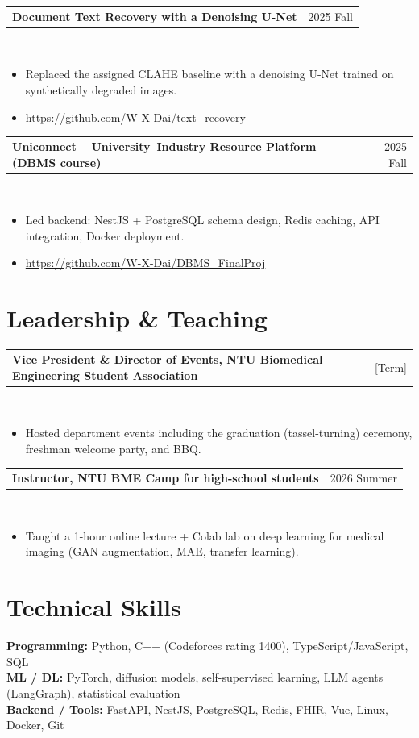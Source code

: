 \documentclass[10pt]{article}
\makeatletter
\newcommand{\entry}[2]{\par\vspace{3pt}\begin{tabularx}{\textwidth}{@{}>{\raggedright\arraybackslash}X r@{}}\textbf{#1} & #2\end{tabularx}\\[-9pt]}
\makeatother
\begin{document}
\entry{Document Text Recovery with a Denoising U-Net}{2025 Fall}
\begin{itemize}
  \item Replaced the assigned CLAHE baseline with a denoising U-Net trained on synthetically degraded images.
        
  \item \href{https://github.com/W-X-Dai/text_recovery}{https://github.com/W-X-Dai/text\_recovery}
\end{itemize}

\entry{Uniconnect -- University--Industry Resource Platform (DBMS course)}{2025 Fall}
\begin{itemize}
  \item Led backend: NestJS + PostgreSQL schema design, Redis caching, API integration, Docker deployment.
  \item \href{https://github.com/W-X-Dai/DBMS_FinalProj}{https://github.com/W-X-Dai/DBMS\_FinalProj}
\end{itemize}

\section*{Leadership \& Teaching}
\entry{Vice President \& Director of Events, NTU Biomedical Engineering Student Association}{[Term]}
\begin{itemize}
  \item Hosted department events including the graduation (tassel-turning) ceremony, freshman welcome party, and BBQ.
\end{itemize}
\entry{Instructor, NTU BME Camp for high-school students}{2026 Summer}
\begin{itemize}
  \item Taught a 1-hour online lecture + Colab lab on deep learning for medical imaging (GAN augmentation, MAE, transfer learning).
\end{itemize}

\section*{Technical Skills}
\textbf{Programming:} Python, C++ (Codeforces rating 1400), TypeScript/JavaScript, SQL \\
\textbf{ML / DL:} PyTorch, diffusion models, self-supervised learning, LLM agents (LangGraph), statistical evaluation \\
\textbf{Backend / Tools:} FastAPI, NestJS, PostgreSQL, Redis, FHIR, Vue, Linux, Docker, Git
\end{document}
